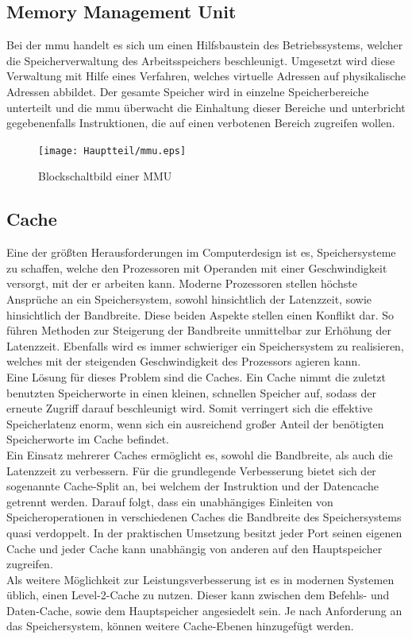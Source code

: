 \subsection{Memory Management Unit}\label{kap:mmu}

Bei der \ac{mmu} handelt es sich um einen Hilfsbaustein des Betriebssystems, welcher die Speicherverwaltung des Arbeitsspeichers beschleunigt. Umgesetzt wird diese Verwaltung mit
Hilfe eines Verfahren, welches virtuelle Adressen auf physikalische Adressen abbildet. Der gesamte Speicher wird in einzelne Speicherbereiche unterteilt und die
\ac{mmu} überwacht die Einhaltung dieser Bereiche und unterbricht gegebenenfalls Instruktionen, die auf einen verbotenen
Bereich zugreifen wollen.\cite{itwissen}\\

\begin{figure}[H]
\centering
\texttt{[image: Hauptteil/mmu.eps]}
\caption{Blockschaltbild einer MMU}\label{fig:mmu}
\end{figure}


\subsection{Cache}\label{kap:cache}
Eine der größten Herausforderungen im Computerdesign ist es, Speichersysteme zu schaffen, welche den Prozessoren mit Operanden mit einer Geschwindigkeit versorgt, mit der er arbeiten kann.
Moderne Prozessoren stellen höchste Ansprüche an ein Speichersystem, sowohl hinsichtlich der Latenzzeit, sowie hinsichtlich der Bandbreite. Diese beiden Aspekte stellen einen Konflikt dar. So führen
Methoden zur Steigerung der Bandbreite unmittelbar zur Erhöhung der Latenzzeit.
Ebenfalls wird es immer schwieriger ein Speichersystem zu realisieren, welches mit der steigenden Geschwindigkeit des Prozessors agieren kann.\\
Eine Lösung für dieses Problem sind die Caches. Ein Cache nimmt die zuletzt benutzten Speicherworte in einen kleinen, schnellen Speicher auf, sodass der erneute Zugriff darauf beschleunigt wird.
Somit verringert sich die effektive Speicherlatenz enorm, wenn sich ein ausreichend großer Anteil der benötigten Speicherworte im Cache befindet.\\
Ein Einsatz mehrerer Caches ermöglicht es, sowohl die Bandbreite, als auch die Latenzzeit zu verbessern. Für die grundlegende Verbesserung bietet sich der sogenannte Cache-Split an, bei
welchem der Instruktion und der Datencache getrennt werden. Darauf folgt, dass ein unabhängiges Einleiten von Speicheroperationen in verschiedenen Caches die Bandbreite des
Speichersystems quasi verdoppelt. In der praktischen Umsetzung besitzt jeder Port seinen eigenen Cache und jeder Cache kann unabhängig von anderen auf den Hauptspeicher zugreifen.\\
Als weitere Möglichkeit zur Leistungsverbesserung ist es in modernen Systemen üblich, einen Level-2-Cache zu nutzen. Dieser kann zwischen dem Befehls- und Daten-Cache, sowie dem Hauptspeicher
angesiedelt sein. Je nach Anforderung an das Speichersystem, können weitere Cache-Ebenen hinzugefügt werden. \\


